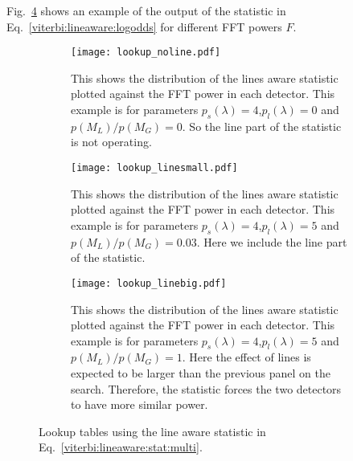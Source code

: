 Fig.~\ref{viterbi:las:osgl_plots} shows an example of the output of the statistic in Eq.~\ref{viterbi:lineaware:logodds} for different \ac{FFT} powers $F$.
\begin{figure}
\centering

\begin{subfigure}[h]{\linewidth}
\begin{minipage}{0.65\linewidth}
\texttt{[image: lookup\_noline.pdf]}
\end{minipage}\hfill
\begin{minipage}{0.35\linewidth}
\caption{This shows the distribution of the lines aware statistic plotted against the \ac{FFT} power in each detector. This example is for parameters $p_s(\lambda) = 4$,$p_l(\lambda) = 0$ and $p(M_L)/p(M_G) = 0$. So the line part of the statistic is not operating.}
\label{viterbi:plot:data}
\end{minipage}
\end{subfigure}

\begin{subfigure}[h]{\linewidth}
\begin{minipage}{0.65\linewidth}
\texttt{[image: lookup\_linesmall.pdf]}
\end{minipage}\hfill
\begin{minipage}{0.35\linewidth}
\caption{This shows the distribution of the lines aware statistic plotted against the \ac{FFT} power in each detector. This example is for parameters $p_s(\lambda) = 4$,$p_l(\lambda) = 5$ and $p(M_L)/p(M_G) = 0.03$. Here we include the line part of the statistic.}
\label{viterbi:plot:data}
\end{minipage}
\end{subfigure}

\begin{subfigure}[h]{\linewidth}
\begin{minipage}{0.65\linewidth}
\texttt{[image: lookup\_linebig.pdf]}
\end{minipage}\hfill
\begin{minipage}{0.35\linewidth}
\caption{This shows the distribution of the lines aware statistic plotted against the \ac{FFT} power in each detector. This example is for parameters $p_s(\lambda) = 4$,$p_l(\lambda) = 5$ and $p(M_L)/p(M_G) = 1$. Here the effect of lines is expected to be larger than the previous panel on the search. Therefore, the statistic forces the two detectors to have more similar power.}
\label{viterbi:plot:data}
\end{minipage}
\end{subfigure}
\caption{Lookup tables using the line aware statistic in Eq.~\ref{viterbi:lineaware:stat:multi}.}
\label{viterbi:las:osgl_plots}
\end{figure}



